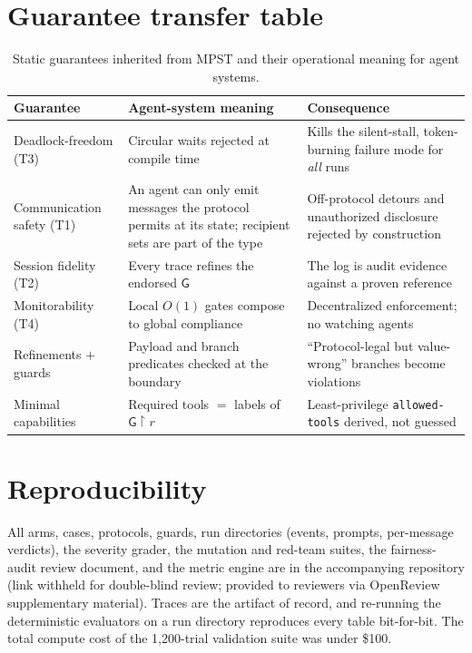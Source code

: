 \documentclass{article}
\newcommand{\gtG}{\mathsf{G}}
\newcommand{\proj}[2]{#1\!\upharpoonright\!#2}
\begin{document}
\section{Guarantee transfer table}\label{app:guar}
\begin{table}[h]
\centering\small
\caption{Static guarantees inherited from MPST and their operational meaning for agent systems.}
\label{tab:guarantees}
\begin{tabular}{@{}p{3.2cm}p{5.3cm}p{4.6cm}@{}}
\toprule
\textbf{Guarantee} & \textbf{Agent-system meaning} & \textbf{Consequence} \\
\midrule
Deadlock-freedom (T3) & Circular waits rejected at compile time & Kills the silent-stall, token-burning failure mode for \emph{all} runs \\
Communication safety (T1) & An agent can only emit messages the protocol permits at its state; recipient sets are part of the type & Off-protocol detours and unauthorized disclosure rejected by construction \\
Session fidelity (T2) & Every trace refines the endorsed $\gtG$ & The log is audit evidence against a proven reference \\
Monitorability (T4) & Local $O(1)$ gates compose to global compliance & Decentralized enforcement; no watching agents \\
Refinements $+$ guards & Payload and branch predicates checked at the boundary & ``Protocol-legal but value-wrong'' branches become violations \\
Minimal capabilities & Required tools $=$ labels of $\proj{\gtG}{r}$ & Least-privilege \texttt{allowed-tools} derived, not guessed \\
\bottomrule
\end{tabular}
\end{table}

\section{Reproducibility}\label{app:repro}
All arms, cases, protocols, guards, run directories (events, prompts, per-message verdicts), the severity grader, the mutation and red-team suites, the fairness-audit review document, and the metric engine are in the accompanying repository (link withheld for double-blind review; provided to reviewers via OpenReview supplementary material). Traces are the artifact of record, and re-running the deterministic evaluators on a run directory reproduces every table bit-for-bit. The total compute cost of the 1{,}200-trial validation suite was under \$100.
\end{document}
